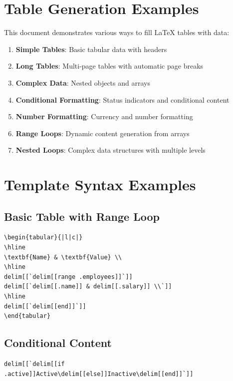 \documentclass{article}
\begin{document}
\section{Table Generation Examples}

This document demonstrates various ways to fill LaTeX tables with data:

\begin{enumerate}
\item \textbf{Simple Tables}: Basic tabular data with headers
\item \textbf{Long Tables}: Multi-page tables with automatic page breaks
\item \textbf{Complex Data}: Nested objects and arrays
\item \textbf{Conditional Formatting}: Status indicators and conditional content
\item \textbf{Number Formatting}: Currency and number formatting
\item \textbf{Range Loops}: Dynamic content generation from arrays
\item \textbf{Nested Loops}: Complex data structures with multiple levels
\end{enumerate}

\section{Template Syntax Examples}

\subsection{Basic Table with Range Loop}
\begin{verbatim}
\begin{tabular}{|l|c|}
\hline
\textbf{Name} & \textbf{Value} \\
\hline
delim[[`delim[[range .employees]]`]]
delim[[`delim[[.name]] & delim[[.salary]] \\`]]
\hline
delim[[`delim[[end]]`]]
\end{tabular}
\end{verbatim}

\subsection{Conditional Content}
\begin{verbatim}
delim[[`delim[[if .active]]Active\delim[[else]]Inactive\delim[[end]]`]]
\end{verbatim}
\end{document}
